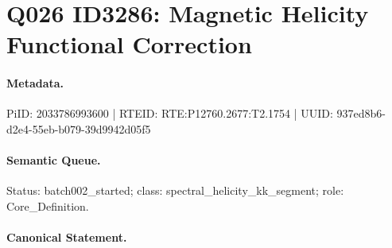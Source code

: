 \section*{Q026 ID3286: Magnetic Helicity Functional Correction}
\paragraph{Metadata.}
PiID: 2033786993600 | RTEID: RTE:P12760.2677:T2.1754 | UUID: 937ed8b6-d2e4-55eb-b079-39d9942d05f5

\paragraph{Semantic Queue.}
Status: batch002\_started; class: spectral\_helicity\_kk\_segment; role: Core\_Definition.

\paragraph{Canonical Statement.}
